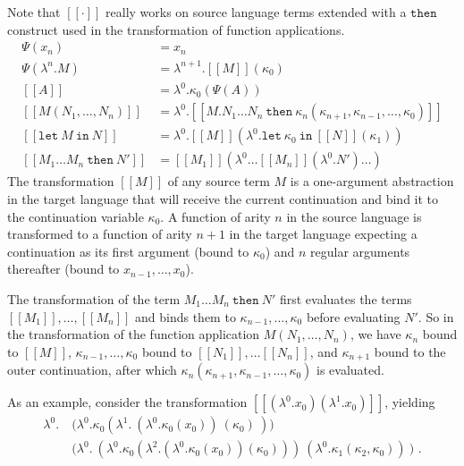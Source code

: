 \documentclass[a4paper,11pt,draft]{article}
\newcommand{\kw}[1]{\mathtt{#1}}
\begin{document}
Note that $[\![\cdot]\!]$ really works on source language terms extended with
a $\kw{then}$ construct used in the transformation of function applications.
\begin{align*}
\Psi(x_{n}) &=
  x_{n} \\
\Psi(\lambda^{n}.M) &=
  \lambda^{n+1}.[\![M]\!](\kappa_{0}) \\[1em]
[\![A]\!] &=
  \lambda^{0}.\kappa_{0} (\Psi(A)) \\
[\![M(N_{1}, \ldots, N_{n})]\!] &=
  \lambda^{0}.[\![M . N_{1} \ldots N_{n} \: \kw{then} \:
  \kappa_{n}(\kappa_{n+1}, \kappa_{n-1}, \ldots, \kappa_{0})]\!] \\
[\![\kw{let} \: M \: \kw{in} \: N]\!] &=
  \lambda^{0}.[\![M]\!] (\lambda^{0}.\kw{let} \:
  \kappa_{0} \: \kw{in} \: [\![N]\!] (\kappa_{1})) \\
[\![M_{1} \ldots M_{n} \: \kw{then} \: N']\!] &=
  [\![M_{1}]\!] (\lambda^{0} \ldots [\![M_{n}]\!] (\lambda^{0}.N') \ldots )
\end{align*}
The transformation $[\![M]\!]$ of any source term $M$ is a one-argument
abstraction in the target language that will receive the current continuation
and bind it to the continuation variable $\kappa_{0}$. A function of arity $n$
in the source language is transformed to a function of arity $n+1$ in the
target language expecting a continuation as its first argument (bound
to $\kappa_{0}$) and $n$ regular arguments thereafter
(bound to $x_{n-1}, \ldots, x_{0}$).

The transformation of the term $M_{1} \ldots M_{n} \: \kw{then} \: N'$ first
evaluates the terms
$[\![M_{1}]\!], \ldots, [\![M_{n}]\!]$ and binds them to
$\kappa_{n-1}, \ldots, \kappa_{0}$ before evaluating $N'$. So in the
transformation of the function application
$M(N_{1}, \ldots, N_{n})$, we have $\kappa_{n}$ bound to $[\![M]\!]$,
$\kappa_{n-1}, \ldots, \kappa_{0}$ bound to $[\![N_{1}]\!], \ldots [\![N_{n}]\!]$,
and $\kappa_{n+1}$ bound to the outer continuation, after which
$\kappa_{n}(\kappa_{n+1}, \kappa_{n-1}, \ldots, \kappa_{0})$ is evaluated.

As an example, consider the transformation
$[\![(\lambda^{0}.x_{0})(\lambda^{1}.x_{0})]\!]$, yielding
\begin{align*}
  \lambda^{0}. \:& \bigl( \lambda^{0}.\kappa_{0}(\lambda^{1}. \: (\lambda^{0}.\kappa_{0}(x_{0})) \: (\kappa_{0}) \: ) \bigr)\\
  & \bigl( \lambda^{0}. \: (\lambda^{0}.\kappa_{0}(\lambda^{2}.(\lambda^{0}.\kappa_{0}(x_{0}))(\kappa_{0}))) \: (\lambda^{0}.\kappa_{1}(\kappa_{2},\kappa_{
    0})) \: \bigr) \text{ .}
\end{align*}
\end{document}
